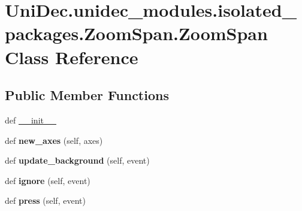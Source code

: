 \hypertarget{class_uni_dec_1_1unidec__modules_1_1isolated__packages_1_1_zoom_span_1_1_zoom_span}{}\section{Uni\+Dec.\+unidec\+\_\+modules.\+isolated\+\_\+packages.\+Zoom\+Span.\+Zoom\+Span Class Reference}
\label{class_uni_dec_1_1unidec__modules_1_1isolated__packages_1_1_zoom_span_1_1_zoom_span}
\subsection*{Public Member Functions}
\begin{DoxyCompactItemize}
\item 
def \hyperlink{class_uni_dec_1_1unidec__modules_1_1isolated__packages_1_1_zoom_span_1_1_zoom_span_afaba16554c36f6662d37bab7664fb247}{\+\_\+\+\_\+init\+\_\+\+\_\+}
\item 
\hypertarget{class_uni_dec_1_1unidec__modules_1_1isolated__packages_1_1_zoom_span_1_1_zoom_span_a3fe762d8c2638929ccec209a8dc5ada7}{}def {\bfseries new\+\_\+axes} (self, axes)\label{class_uni_dec_1_1unidec__modules_1_1isolated__packages_1_1_zoom_span_1_1_zoom_span_a3fe762d8c2638929ccec209a8dc5ada7}

\item 
\hypertarget{class_uni_dec_1_1unidec__modules_1_1isolated__packages_1_1_zoom_span_1_1_zoom_span_aad9df19ffa6e7aea2b02fb478de0eaab}{}def {\bfseries update\+\_\+background} (self, event)\label{class_uni_dec_1_1unidec__modules_1_1isolated__packages_1_1_zoom_span_1_1_zoom_span_aad9df19ffa6e7aea2b02fb478de0eaab}

\item 
\hypertarget{class_uni_dec_1_1unidec__modules_1_1isolated__packages_1_1_zoom_span_1_1_zoom_span_a626b6ba7ba66f7b97f8be42c31e538d2}{}def {\bfseries ignore} (self, event)\label{class_uni_dec_1_1unidec__modules_1_1isolated__packages_1_1_zoom_span_1_1_zoom_span_a626b6ba7ba66f7b97f8be42c31e538d2}

\item 
\hypertarget{class_uni_dec_1_1unidec__modules_1_1isolated__packages_1_1_zoom_span_1_1_zoom_span_a8cfa0f0bc3e6ec230fcd10403c68b741}{}def {\bfseries press} (self, event)\label{class_uni_dec_1_1unidec__modules_1_1isolated__packages_1_1_zoom_span_1_1_zoom_span_a8cfa0f0bc3e6ec230fcd10403c68b741}


\end{DoxyCompactItemize}
